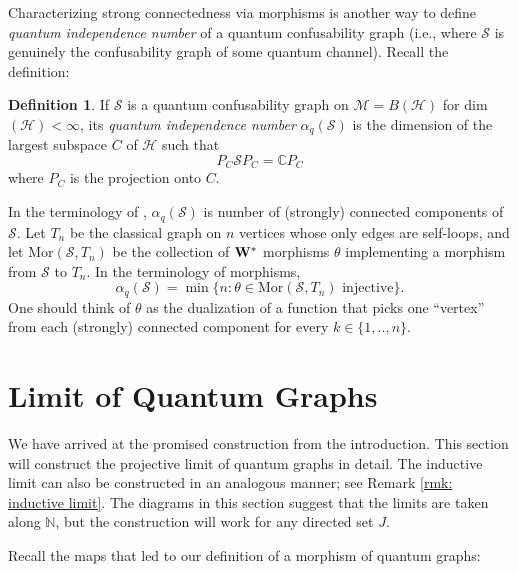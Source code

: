 \documentclass[12pt]{article}
\theoremstyle{definition}
\newtheorem{definition}[theorem]{Definition}
\newenvironment{remark}
  {\pushQED{\qed}\renewcommand{\qedsymbol}{\textcircled{\tiny R}}\remarkx}
  {\popQED\endremarkx}
\newcommand{\N}{\mathbb N}
\newcommand{\C}{\mathbb C}
\newcommand{\mc}[1]{\mathcal{#1}}
\newcommand{\<}{\langle}
\renewcommand{\>}{\rangle}
\newcommand{\Ann}{\text{Ann}}
\begin{document}
\begin{remark}
    Characterizing strong connectedness via morphisms is another way to define \textit{quantum independence number} of a quantum confusability graph (i.e., where $\mc S$ is genuinely the confusability graph of some quantum channel). Recall the definition:
    \begin{definition} \cite[p. 6]{dsw}
        If $\mc S$ is a quantum confusability graph on $\mc M =  B(\mc H)$ for dim$(\mc H) < \infty$, its \textit{quantum independence number} $\alpha_q(\mc S)$ is the dimension of the largest subspace $C$ of $\mc H$ such that 
        \[
        P_C \mc S P_C = \C P_C
        \]
        where $P_C$ is the projection onto $C$.
    \end{definition}
     In the terminology of \cite{connected-qgraphs}, $\alpha_q(\mc S)$ is number of (strongly) connected components of $\mc S$. Let $T_n$ be the classical graph on $n$ vertices whose only edges are self-loops, and let Mor$(\mc S, T_n)$ be the collection of ${\bf W^*}$ morphisms $\theta$ implementing a morphism from $\mc S$ to $T_n$. In the terminology of morphisms,
        \[
        \alpha_q(\mc S) = \min\{n : \theta \in \text{Mor}(\mc S, T_n) \text{ injective}\}.
        \]
    One should think of $\theta$ as the dualization of a function that picks one ``vertex'' from each (strongly) connected component for every $k \in \{1,..,n\}$.
\end{remark}


\section{Limit of Quantum Graphs} \label{sec: limit of q graphs}

We have arrived at the promised construction from the introduction. This section will construct the projective limit of quantum graphs in detail. The inductive limit can also be constructed in an analogous manner; see Remark \ref{rmk: inductive limit}. The diagrams in this section suggest that the limits are taken along $\N$, but the construction will work for any directed set $J$.

Recall the maps that led to our definition of a morphism of quantum graphs:
\begin{center}
\end{center}
\end{document}
